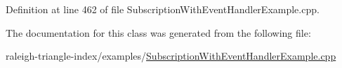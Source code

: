 Definition at line 462 of file Subscription\+With\+Event\+Handler\+Example.\+cpp.



The documentation for this class was generated from the following file\+:\begin{DoxyCompactItemize}
\item 
raleigh-\/triangle-\/index/examples/\hyperlink{_subscription_with_event_handler_example_8cpp}{Subscription\+With\+Event\+Handler\+Example.\+cpp}\end{DoxyCompactItemize}
